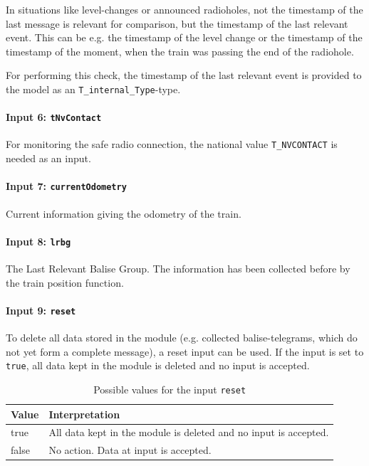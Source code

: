 \documentclass{template/openetcs_report}
\begin{document}
In situations like level-changes or announced radioholes, not the timestamp of the last message is relevant for comparison, but the timestamp of the last relevant event. This can be e.g. the timestamp of the level change or the timestamp of the timestamp of the moment, when the train was passing the end of the radiohole. 

For performing this check, the timestamp of the last relevant event is provided to the model as an \texttt{T\_internal\_Type}-type.

\paragraph{Input 6: \texttt{tNvContact}}

For monitoring the safe radio connection, the national value \texttt{T\_NVCONTACT} is needed as an input.

\paragraph{Input 7: \texttt{currentOdometry}}
Current information giving the odometry of the train. 

\paragraph{Input 8: \texttt{lrbg}}
The Last Relevant Balise Group. The information has been collected before by the train position function.

\paragraph{Input 9: \texttt{reset}}
To delete all data stored in the module (e.g. collected balise-telegrams, which do not yet form a complete message), a reset input can be used. If the input is set to \texttt{true}, all data kept in the module is deleted and no input is accepted.

\begin{table}[H]
  \begin{tabular}{| l | p{9cm} |}
    \hline
    \textbf{Value} & \textbf{Interpretation}\\ \hline
    true & All data kept in the module is deleted and no input is accepted.\\
    false & No action. Data at input is accepted.\\
    \hline
  \end{tabular} 
  \caption{Possible values for the input \texttt{reset}}
  \label{tbl:reset}
\end{table}
\end{document}
